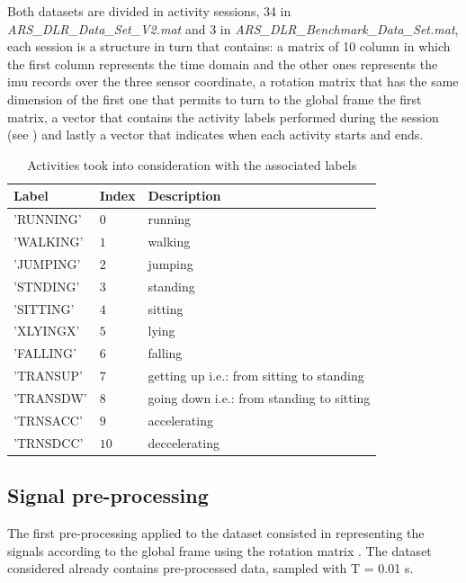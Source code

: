 Both datasets are divided in activity sessions, 34 in \textit{ARS\_DLR\_Data\_Set\_V2.mat} and 3 in \textit{ARS\_DLR\_Benchmark\_Data\_Set.mat}, each session is a structure in turn  that contains: a matrix of 10 column in which the first column represents the time domain and the other ones represents the \gls{imu} records over the three sensor coordinate, a rotation matrix that has the same dimension of the first one that permits to turn to the global frame the first matrix, a vector that contains the activity labels performed during the session (see ) and lastly a vector that indicates when each activity starts and ends.

\begin{table}[htp]
\small
	\centering
		\renewcommand{\arraystretch}{1}%
	\begin{tabular}{@{}lll@{}}
	\toprule
	Label & Index & Description\\ \midrule
	'RUNNING' & $0$ & running \\
	'WALKING' & $1$ & walking \\
	'JUMPING' & $2$ & jumping  \\
	'STNDING' & $3$ & standing \\ 
	'SITTING' & $4$ & sitting\\
	'XLYINGX' & $5$ & lying \\
	'FALLING' & $6$ & falling \\
	'TRANSUP' & $7$ & getting up i.e.: from sitting to standing \\
	'TRANSDW' & $8$ & going down i.e.: from standing to sitting\\
	'TRNSACC' & $9$ & accelerating\\
	'TRNSDCC' & $10$ & deccelerating\\
	\bottomrule
	\end{tabular}
	\caption{Activities took into consideration with the associated labels}
	\label{tab:label}
\end{table}


\subsection{Signal pre-processing}
The first pre-processing applied to the dataset consisted in representing the signals according to the global frame using the rotation matrix . The dataset considered already contains pre-processed data, sampled with T = 0.01 s. 

